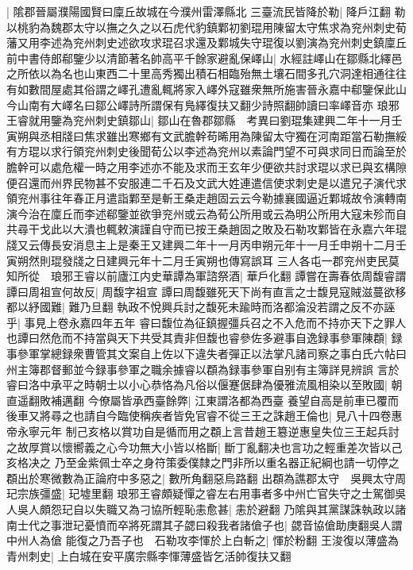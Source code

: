 |{
	隂郡晉屬濮陽國賢曰廩丘故城在今濮州雷澤縣北}
三臺流民皆降於勒|{
	降戶江翻}
勒以桃豹為魏郡太守以撫之久之以石虎代豹鎮鄴初劉琨用陳留太守焦求為兖州刺史荀藩又用李述為兖州刺史述欲攻求琨召求還及鄴城失守琨復以劉演為兖州刺史鎮廩丘前中書侍郎郗鑒少以清節著名帥高平千餘家避亂保嶧山|{
	水經註嶧山在鄒縣北繹邑之所依以為名也山東西二十里高秀獨出積石相臨殆無土壤石間多孔穴洞達相通往往有如數間屋處其俗謂之嶧孔遭亂輒將家入嶧外寇雖衆無所施害晉永嘉中郗鑒保此山今山南有大嶧名曰鄒公嶧詩所謂保有鳬繹復扶又翻少詩照翻帥讀曰率嶧音亦}
琅邪王睿就用鑒為兖州刺史鎮鄒山|{
	鄒山在魯郡鄒縣　考異曰劉琨集建興二年十一月壬寅朔與丞相牋曰焦求雖出寒鄉有文武膽幹苟晞用為陳留太守獨在河南距當石勒撫綏有方琨以求行領兖州刺史後聞荀公以李述為兖州以素論門望不可與求同日而論至於膽幹可以處危權一時之用李述亦不能及求而王玄年少便欲共討求琨以求已與玄構隙便召還而州界民物甚不安服連二千石及文武大姓連遣信使求刺史是以遣兄子演代求領兖州事往年春正月遣詣鄴至是斬王桑走趙固云云今勒據襄國逼近鄴城故令演轉南演今治在廩丘而李述郗鑒並欲爭兖州或云為荀公所用或云為明公所用大寇未殄而自共尋干戈此以大潰也輒敕演謹自守而已按王桑趙固之敗及石勒攻鄴皆在永嘉六年琨牋又云傳長安消息主上是秦王又建興二年十一月丙申朔元年十一月壬申朔十二月壬寅朔然則琨發牋之日建興元年十二月壬寅朔也傳寫誤耳}
三人各屯一郡兖州吏民莫知所從　琅邪王睿以前廬江内史華譚為軍諮祭酒|{
	華戶化翻}
譚嘗在壽春依周馥睿謂譚曰周祖宣何故反|{
	周馥字祖宣}
譚曰周馥雖死天下尚有直言之士馥見寇賊滋蔓欲移都以紓國難|{
	難乃旦翻}
執政不悅興兵討之馥死未踰時而洛都淪没若謂之反不亦誣乎|{
	事見上卷永嘉四年五年}
睿曰馥位為征鎮握彊兵召之不入危而不持亦天下之罪人也譚曰然危而不持當與天下共受其責非但馥也睿參佐多避事自逸録事參軍陳頵|{
	録事參軍掌總録衆曹管其文案自上佐以下違失者彈正以法掌凡諸司察之事白氏六帖曰州主簿郡督郵並今録事參軍之職余據睿以頵為録事參軍自别有主簿詳見辨誤}
言於睿曰洛中承平之時朝士以小心恭恪為凡俗以偃蹇倨肆為優雅流風相染以至敗國|{
	朝直遥翻敗補邁翻}
今僚屬皆承西臺餘弊|{
	江東謂洛都為西臺}
養望自高是前車已覆而後車又將尋之也請自今臨使稱疾者皆免官睿不從三王之誅趙王倫也|{
	見八十四卷惠帝永寧元年}
制己亥格以賞功自是循而用之頵上言昔趙王簒逆惠皇失位三王起兵討之故厚賞以懷嚮義之心今功無大小皆以格斷|{
	斷丁亂翻决也言功之輕重差次皆以己亥格决之}
乃至金紫佩士卒之身符策委僕隸之門非所以重名器正紀綱也請一切停之頵出於寒微數為正論府中多惡之|{
	數所角翻惡烏路翻}
出頵為譙郡太守　吳興太守周玘宗族彊盛|{
	玘墟里翻}
琅邪王睿頗疑憚之睿左右用事者多中州亡官失守之士駕御吳人吳人頗怨玘自以失職又為刁協所輕恥恚愈甚|{
	恚於避翻}
乃隂與其黨謀誅執政以諸南士代之事泄玘憂憤而卒將死謂其子勰曰殺我者諸傖子也|{
	勰音協傖助庚翻吳人謂中州人為傖}
能復之乃吾子也　石勒攻李惲於上白斬之|{
	惲於粉翻}
王浚復以薄盛為青州刺史|{
	上白城在安平廣宗縣李惲薄盛皆乞活帥復扶又翻}
